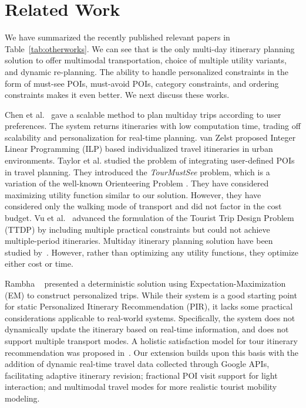 \section{Related Work}
\label{Rel_Work}

We have summarized the recently published relevant papers in Table~\ref{tab:otherworks}. We can see that \trip is the only multi-day itinerary planning solution to offer multimodal transportation, choice of multiple utility variants, and dynamic re-planning. The ability to handle personalized constraints in the form of must-see POIs, must-avoid POIs, category constraints, and ordering constraints makes it even better. We next discuss these works.
 
Chen et al.~\cite{chen2014automatic} gave a scalable method to plan multiday trips according to user preferences. The system returns itineraries with low computation time, trading off scalability and personalization for real-time planning. van Zelst \cite{vanzelst2016itinerary} proposed Integer Linear Programming (ILP) based individualized travel itineraries in urban environments. Taylor et al. \cite{taylor2018tour} studied the problem of integrating user-defined POIs in travel planning. They introduced the \emph{TourMustSee} problem, which is a variation of the well-known Orienteering Problem \cite{golden1987orienteering}. They have considered maximizing utility function similar to our \emph{\trip} solution. However, they have considered only the walking mode of transport and did not factor in the cost budget. Vu et al.~\cite{vu2022branch} advanced the formulation of the Tourist Trip Design Problem (TTDP) by including multiple practical constraints but could not achieve multiple-period itineraries. Multiday itinerary planning solution have been studied by~\cite{chen2014automatic,vanzelst2016itinerary,liu2024personalized,rambha2024optimized}. However, rather than optimizing any utility functions, they optimize either cost or time.  

Rambha ~\cite{panagiotakis2024expectation} presented a deterministic solution using Expectation-Maximization (EM) to construct personalized trips. While their system is a good starting point for static Personalized Itinerary Recommendation (PIR), it lacks some practical considerations applicable to real-world systems. Specifically, the system does not dynamically update the itinerary based on real-time information, and does not support multiple transport modes. A holistic satisfaction model for tour itinerary recommendation was proposed in~\cite{liu2024personalized}. Our extension builds upon this basis with the addition of dynamic real-time travel data collected through Google APIs, facilitating adaptive itinerary revision; fractional POI visit support for light interaction; and multimodal travel modes for more realistic tourist mobility modeling. 

